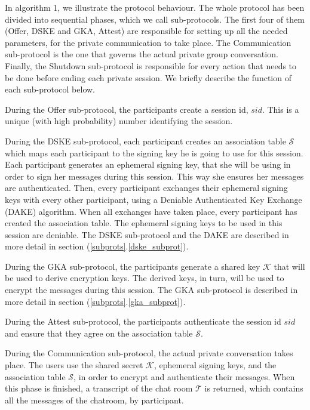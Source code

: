 \documentclass[]{article}
\begin{document}
In algorithm 1, we illustrate the protocol behaviour.
The whole protocol has been divided into sequential phases, which we call sub-protocols.
The first four of them (Offer, DSKE and GKA, Attest) are responsible for setting up all the needed parameters, for the private communication to take place.
The Communication sub-protocol is the one that governs the actual private group conversation.
Finally, the Shutdown sub-protocol is responsible for every action that needs to be done before ending each private session.
We briefly describe the function of each sub-protocol below.

During the Offer sub-protocol, the participants create a session id, $sid$.
This is a unique (with high probability) number identifying the session.

During the DSKE sub-protocol, each participant creates an association table $\mathcal{S}$ which maps each participant to the signing key he is going to use for this session.
Each participant generates an ephemeral signing key, that she will be using in order to sign her messages during this session.
This way she ensures her messages are authenticated.
Then, every participant exchanges their ephemeral signing keys with every other participant, using a Deniable Authenticated Key Exchange (DAKE) algorithm.
When all exchanges have taken place, every participant has created the association table.
The ephemeral signing keys to be used in this session are deniable.
The DSKE sub-protocol and the DAKE are described in more detail in section (\ref{subprots}.\ref{dske_subprot}).

During the GKA sub-protocol, the participants generate a shared key $\mathcal{K}$ that will be used to derive encryption keys.
The derived keys, in turn, will be used to encrypt the messages during this session.
The GKA sub-protocol is described in more detail in section (\ref{subprots}.\ref{gka_subprot}).

During the Attest sub-protocol, the participants authenticate the session id $sid$ and ensure that they agree on the association table $\mathcal{S}$.

During the Communication sub-protocol, the actual private conversation takes place.
The users use the shared secret $\mathcal{K}$, ephemeral signing keys, and the association table $\mathcal{S}$, in order to encrypt and authenticate their messages.
When this phase is finished, a transcript of the chat room $\mathcal{T}$ is returned, which contains all the messages of the chatroom, by participant.
\end{document}
